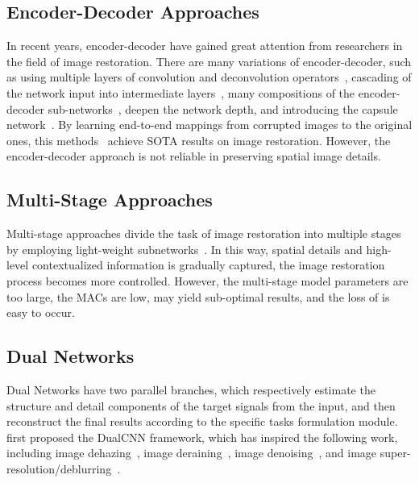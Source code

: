 \documentclass[lettersize,journal]{IEEEtran}
\begin{document}
\subsection{Encoder-Decoder Approaches} 
In recent years, encoder-decoder have gained great attention from researchers in the field of image restoration. There are many variations of encoder-decoder, such as using multiple layers of convolution and deconvolution operators~\cite{2016Imagenip}, cascading of the network input into intermediate layers~\cite{Mastan2019MultiLevelEA}, many compositions of the encoder-decoder sub-networks~\cite{2022As}, deepen the  network depth, and introducing the capsule network~\cite{2020RedCap}. By learning end-to-end mappings from corrupted images to the original ones, this methods~\cite{Zamir2021MPRNet,Zamir2021Restormer,2020arXiv201215028C} achieve SOTA results on image restoration. However, the encoder-decoder approach is not reliable in preserving spatial image details.

\subsection{Multi-Stage Approaches} 
Multi-stage approaches divide the task of image restoration into multiple stages by employing light-weight subnetworks~\cite{2018Scale,2018Lightweight,RESCAN,PREnet,Zamir2021MPRNet,zhang2022event,Zhang_2019_CVPR}. In this way, spatial details and high-level contextualized information is gradually captured, the image restoration process becomes more controlled. However, the multi-stage model parameters are too large, the MACs are low, may yield sub-optimal results, and the loss of  is easy to occur. 

\subsection{Dual Networks} 
 Dual Networks have two parallel branches, which respectively estimate the structure and detail components of the target signals from the input, and then reconstruct the final results according to the specific tasks formulation module. \cite{2018LearningD}first proposed the DualCNN framework, which has inspired the following work, including image dehazing~\cite{2018DehazeGAN,2019Dense,2019Dual}, image deraining~\cite{2018Fast}, image denoising~\cite{tian2021designing}, and image super-resolution/deblurring~\cite{2020Refining}. 
\end{document}
